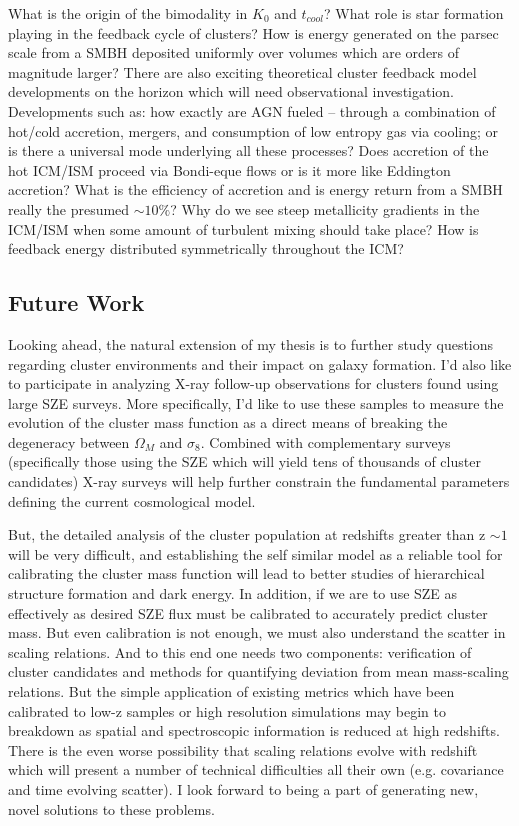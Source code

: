 \documentclass[11pt]{article}
\begin{document}
What is the origin of the bimodality in $K_0$ and $t_{cool}$?
What role is star formation playing in the feedback cycle of clusters?
How is energy generated on the parsec scale from a SMBH deposited
uniformly over volumes which are orders of magnitude larger? There are
also exciting theoretical cluster feedback model developments on the
horizon which will need observational investigation. Developments such
as: how exactly are AGN fueled -- through a combination of hot/cold
accretion, mergers, and consumption of low entropy gas via cooling; or
is there a universal mode underlying all these processes? Does
accretion of the hot ICM/ISM proceed via Bondi-eque flows or is it
more like Eddington accretion? What is the efficiency of accretion and
is energy return from a SMBH really the presumed $\sim 10\%$? Why do
we see steep metallicity gradients in the ICM/ISM when some amount of
turbulent mixing should take place? How is feedback energy distributed
symmetrically throughout the ICM?

\subsection*{Future Work}

Looking ahead, the natural extension of my thesis is to further study
questions regarding cluster environments and their impact on galaxy
formation. I'd also like to participate in analyzing X-ray follow-up
observations for clusters found using large SZE surveys. More
specifically, I'd like to use these samples to measure the evolution
of the cluster mass function as a direct means of breaking the
degeneracy between $\Omega_M$ and $\sigma_8$. Combined with
complementary surveys (specifically those using the SZE which will
yield tens of thousands of cluster candidates) X-ray surveys will help
further constrain the fundamental parameters defining the current
cosmological model.

But, the detailed analysis of the cluster population at redshifts
greater than z $\sim 1$ will be very difficult, and establishing the
self similar model as a reliable tool for calibrating the cluster mass
function will lead to better studies of hierarchical structure
formation and dark energy. In addition, if we are to use SZE as
effectively as desired SZE flux must be calibrated to accurately predict
cluster mass. But even calibration is not enough, we must also
understand the scatter in scaling relations. And to this end one needs
two components: verification of cluster candidates and methods for
quantifying deviation from mean mass-scaling relations. But the simple
application of existing metrics which have been calibrated to low-z
samples or high resolution simulations may begin to breakdown as
spatial and spectroscopic information is reduced at high
redshifts. There is the even worse possibility that scaling relations
evolve with redshift which will present a number of technical
difficulties all their own (e.g. covariance and time evolving
scatter). I look forward to being a part of generating new, novel
solutions to these problems.
\end{document}
